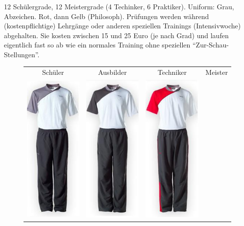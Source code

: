 \documentclass[a4paper,12pt]{scrartcl}
\begin{document}
12 Sch\"ulergrade, 12 Meistergrade (4 Techinker, 6 Praktiker).
Uniform: Grau, Abzeichen. Rot, dann Gelb (Philosoph).
Pr\"ufungen werden w\"ahrend (kostenpflichtige) Lehrg\"ange oder anderen speziellen Trainings (Intensivwoche) abgehalten. Sie kosten zwischen 15 und 25 Euro (je nach Grad) und laufen eigentlich fast so ab wie ein normales Training ohne speziellen ``Zur-Schau-Stellungen''.


\begin{figure}[htbp]
	\centering
	\begin{tabular}{cccc}
		\textsf{Sch\"uler} & \textsf{Ausbilder} & \textsf{Techniker} & \textsf{Meister} %
		\\
		\includegraphics[width=3cm]{image/uniformen/schueler} &
			\includegraphics[width=3cm]{image/uniformen/ausbilder} &
			\includegraphics[width=3cm]{image/uniformen/techniker} &

\end{tabular}
\end{figure}
\end{document}
